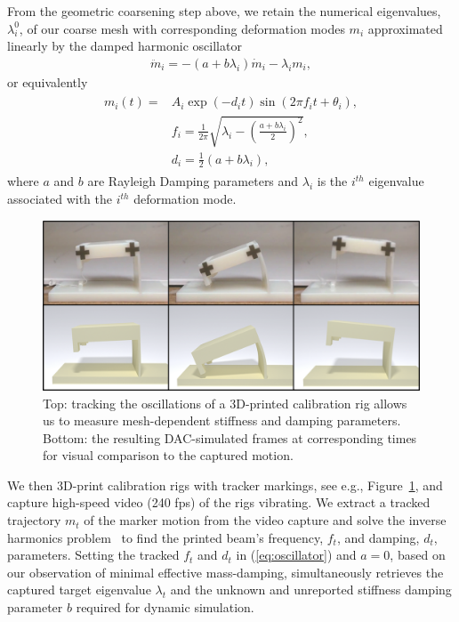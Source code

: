 From the geometric coarsening step above, we retain the numerical eigenvalues, $\lambda_i^0$, of our coarse mesh with corresponding deformation modes $m_i$ approximated linearly by the damped harmonic oscillator~\cite{shabana:2012} 
\begin{align}
\ddot m_i = -(a + b \lambda_i ) \dot m_i - \lambda_i m_i,
\end{align}
or equivalently 
\begin{align}
\begin{split}
m_i(t) = &A_i\exp(-d_i t)\sin(2 \pi f_it+ \theta_i),\\
&f_i = \frac{1}{2\pi}\sqrt{\lambda_i - (\frac{a+ b \lambda_i}{2})^2},\\
&d_i=\frac{1}{2}(a + b \lambda_i),
\label{eq:oscillator}
\end{split}
\end{align} where $a$ and $b$ are Rayleigh Damping parameters and $\lambda_i$ is the $i^{th}$ eigenvalue associated with the $i^{th}$ deformation mode.

\begin{figure}
	\centering
	\includegraphics[width=0.6\columnwidth]{images/calibrationfig.png}
	\caption{Top: tracking the oscillations of a 3D-printed calibration rig allows us to measure mesh-dependent stiffness and damping parameters. Bottom: the resulting DAC-simulated frames at corresponding times for visual comparison to the captured motion.}
	\label{fig:calibrationRig}
\end{figure}

We then 3D-print calibration rigs with tracker markings, see e.g., Figure~\ref{fig:calibrationRig}, and capture high-speed video (240 fps) of the rigs vibrating.  
We extract a tracked trajectory $m_t$ of the marker motion from the video capture and solve the inverse harmonics problem~\citep{Mandelshtam:1997gr} to find the printed beam's frequency, $f_t$, and damping, $d_t$, parameters. Setting the tracked $f_t $ and $d_t$ in (\ref{eq:oscillator}) and $a=0$, based on our observation of minimal effective mass-damping, simultaneously retrieves the captured target eigenvalue $\lambda_t$ and the unknown and unreported stiffness damping parameter $b$ required for dynamic simulation. 

